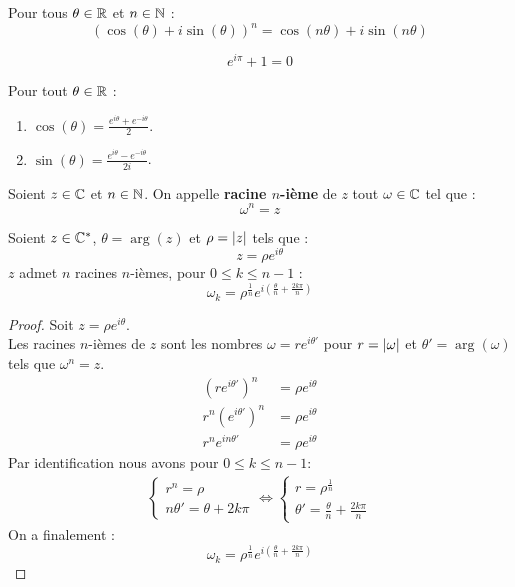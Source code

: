 \begin{proposition}
	Pour tous $\theta \in \mathbb{R}$ et $n \in \mathbb{N}$ :
	\[ (\cos(\theta) + i \sin(\theta))^n = \cos(n \theta) + i \sin(n \theta) \]
\end{proposition}

\begin{proposition}
	\[ e^{i\pi} + 1 = 0 \]
\end{proposition}

\begin{proposition}
	Pour tout $\theta \in \mathbb{R}$ :
	\begin{enumerate}
		\item $\cos(\theta) = \frac{e^{i\theta} + e^{-i\theta}}{2}$.
		\item $\sin(\theta) = \frac{e^{i\theta} - e^{-i\theta}}{2i}$.
	\end{enumerate}
\end{proposition}

\begin{definition}
	Soient $z \in \mathbb{C}$ et $n \in \mathbb{N}$. On appelle \textbf{racine $n$-ième} de $z$ tout $\omega \in \mathbb{C}$ tel que :
	\[ \omega^n = z \] 
\end{definition}

\begin{proposition}
	Soient $z \in \mathbb{C}^*$, $\theta = \arg(z)$ et $\rho = \abs{z}$ tels que :
	\[ z = \rho e^{i\theta} \]
	$z$ admet $n$ racines $n$-ièmes, pour $0 \leq k \leq n - 1$ :
	\[ \omega_k = \rho^{\frac{1}{n}} e^{i \left( \frac{\theta}{n} + \frac{2 k \pi}{n} \right)} \]
\end{proposition}

\begin{proof}
	Soit $z = \rho e^{i \theta}$. \\
	Les racines $n$-ièmes de $z$ sont les nombres $\omega = re^{i \theta'}$ pour $r = \abs{\omega}$ et $\theta' = \arg(\omega)$ tels que $\omega^n = z$.
	\begin{align*}
		(r e^{i \theta'})^n &= \rho e^{i \theta} \\
		r^n (e^{i \theta'})^n &= \rho e^{i \theta} \\
		r^n e^{i n \theta'} &= \rho e^{i \theta}
	\end{align*} 
	Par identification nous avons pour $0 \leq k \leq n - 1$:
	\begin{align*}
		\begin{cases}
			r^n = \rho \\
			n \theta' = \theta + 2 k \pi
		\end{cases}
		\iff 
		\begin{cases}
			r = \rho^{\frac{1}{n}} \\
			\theta' = \frac{\theta}{n} + \frac{2 k \pi}{n}
		\end{cases}
	\end{align*}
	On a finalement : 
	\[ \omega_k = \rho^{\frac{1}{n}} e^{i \left( \frac{\theta}{n} + \frac{2 k \pi}{n} \right) } \]
\end{proof}

